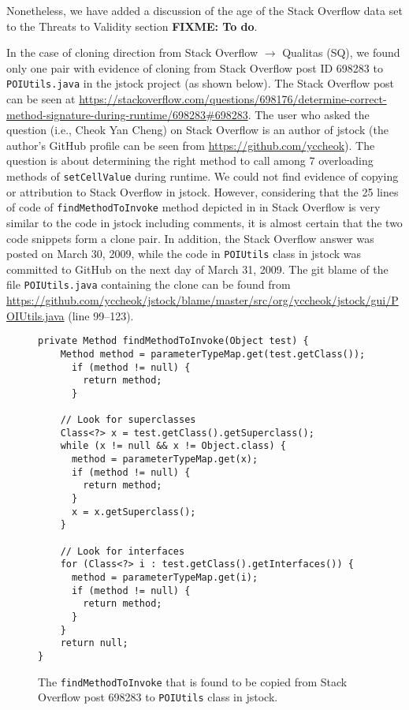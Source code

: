 \documentclass[a4paper,twoside,10pt]{reviewresponse}
\newcommand\FIXME[1]{{\color{red}\textbf{FIXME: #1}}}
\begin{document}
Nonetheless, we have added a discussion of the age of the Stack Overflow data set to the Threats to Validity section \FIXME{To do}.


In the case of cloning direction from Stack Overflow $\rightarrow$ Qualitas
(SQ), we found only one pair with evidence of cloning from Stack Overflow post
ID 698283 to {\small\texttt{POIUtils.java}} in the \textsf{jstock} project (as shown below). 
The Stack Overflow post can be seen at \url{https://stackoverflow.com/questions/698176/determine-correct-method-signature-during-runtime/698283#698283}.
The user who asked the question (i.e., Cheok Yan Cheng) on Stack Overflow is an author of \textsf{jstock} (the author's GitHub profile can be seen from \url{https://github.com/yccheok}). The
question is about determining the right method to call among 7 overloading
methods of {\small\texttt{setCellValue}} during runtime. We could not find
evidence of copying or attribution to Stack Overflow in \textsf{jstock}.
However, considering that the 25 lines of code of
{\small\texttt{findMethodToInvoke}} method depicted in  in Stack Overflow is
very similar to the code in \textsf{jstock} including comments, it is almost
certain that the two code snippets form a clone pair. In addition, the Stack
Overflow answer was posted on March 30, 2009, while the code in
{\small\texttt{POIUtils}} class in \textsf{jstock} was committed to GitHub on
the next day of March 31, 2009. 
The git blame of the file \texttt{POIUtils.java} 
containing the clone can be found from \url{https://github.com/yccheok/jstock/blame/master/src/org/yccheok/jstock/gui/POIUtils.java} (line 99--123).

\begin{figure}[H]
	\begin{lstlisting}
private Method findMethodToInvoke(Object test) {
	Method method = parameterTypeMap.get(test.getClass());
	  if (method != null) {
	    return method;
	  }
	
	// Look for superclasses
	Class<?> x = test.getClass().getSuperclass();
	while (x != null && x != Object.class) {
	  method = parameterTypeMap.get(x);
	  if (method != null) {
	    return method;
	  }
	  x = x.getSuperclass();
	}
	
	// Look for interfaces
	for (Class<?> i : test.getClass().getInterfaces()) {
	  method = parameterTypeMap.get(i);
	  if (method != null) {
	    return method;
	  }
	}
	return null;
}
	\end{lstlisting}
	\caption{The {\small\texttt{findMethodToInvoke}} that is found to be copied from Stack Overflow post 698283 to {\small\texttt{POIUtils}} class in \textsf{jstock}.}
	\label{fig:jstock_code}
\end{figure}
\end{document}
